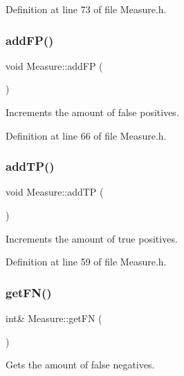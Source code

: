 Definition at line 73 of file Measure.\+h.

\mbox{\label{class_measure_ae3b5b1f8db1a660dd55495bcc69d2a3d}} 
\subsubsection{\texorpdfstring{add\+F\+P()}{addFP()}}
{\footnotesize\ttfamily void Measure\+::add\+FP (\begin{DoxyParamCaption}{ }\end{DoxyParamCaption})\hspace{0.3cm}{\ttfamily [inline]}}

Increments the amount of false positives. 

Definition at line 66 of file Measure.\+h.

\mbox{\label{class_measure_a163284f13b6b79ba19f7db571365c7e1}} 
\subsubsection{\texorpdfstring{add\+T\+P()}{addTP()}}
{\footnotesize\ttfamily void Measure\+::add\+TP (\begin{DoxyParamCaption}{ }\end{DoxyParamCaption})\hspace{0.3cm}{\ttfamily [inline]}}

Increments the amount of true positives. 

Definition at line 59 of file Measure.\+h.

\mbox{\label{class_measure_a9b2213f1dd9fd63e64629ecbb8ecce35}} 
\subsubsection{\texorpdfstring{get\+F\+N()}{getFN()}}
{\footnotesize\ttfamily int\& Measure\+::get\+FN (\begin{DoxyParamCaption}{ }\end{DoxyParamCaption})\hspace{0.3cm}{\ttfamily [inline]}}

Gets the amount of false negatives. 

